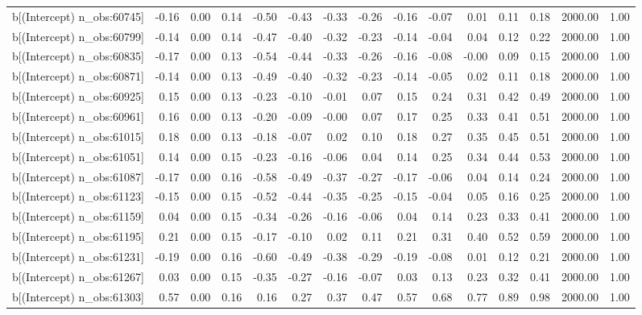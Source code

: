 \begin{table}[ht]
\begin{tabular}{rrrrrrrrrrrrrrr}
  b[(Intercept) n\_obs:60745] & -0.16 & 0.00 & 0.14 & -0.50 & -0.43 & -0.33 & -0.26 & -0.16 & -0.07 & 0.01 & 0.11 & 0.18 & 2000.00 & 1.00 \\ 
  b[(Intercept) n\_obs:60799] & -0.14 & 0.00 & 0.14 & -0.47 & -0.40 & -0.32 & -0.23 & -0.14 & -0.04 & 0.04 & 0.12 & 0.22 & 2000.00 & 1.00 \\ 
  b[(Intercept) n\_obs:60835] & -0.17 & 0.00 & 0.13 & -0.54 & -0.44 & -0.33 & -0.26 & -0.16 & -0.08 & -0.00 & 0.09 & 0.15 & 2000.00 & 1.00 \\ 
  b[(Intercept) n\_obs:60871] & -0.14 & 0.00 & 0.13 & -0.49 & -0.40 & -0.32 & -0.23 & -0.14 & -0.05 & 0.02 & 0.11 & 0.18 & 2000.00 & 1.00 \\ 
  b[(Intercept) n\_obs:60925] & 0.15 & 0.00 & 0.13 & -0.23 & -0.10 & -0.01 & 0.07 & 0.15 & 0.24 & 0.31 & 0.42 & 0.49 & 2000.00 & 1.00 \\ 
  b[(Intercept) n\_obs:60961] & 0.16 & 0.00 & 0.13 & -0.20 & -0.09 & -0.00 & 0.07 & 0.17 & 0.25 & 0.33 & 0.41 & 0.51 & 2000.00 & 1.00 \\ 
  b[(Intercept) n\_obs:61015] & 0.18 & 0.00 & 0.13 & -0.18 & -0.07 & 0.02 & 0.10 & 0.18 & 0.27 & 0.35 & 0.45 & 0.51 & 2000.00 & 1.00 \\ 
  b[(Intercept) n\_obs:61051] & 0.14 & 0.00 & 0.15 & -0.23 & -0.16 & -0.06 & 0.04 & 0.14 & 0.25 & 0.34 & 0.44 & 0.53 & 2000.00 & 1.00 \\ 
  b[(Intercept) n\_obs:61087] & -0.17 & 0.00 & 0.16 & -0.58 & -0.49 & -0.37 & -0.27 & -0.17 & -0.06 & 0.04 & 0.14 & 0.24 & 2000.00 & 1.00 \\ 
  b[(Intercept) n\_obs:61123] & -0.15 & 0.00 & 0.15 & -0.52 & -0.44 & -0.35 & -0.25 & -0.15 & -0.04 & 0.05 & 0.16 & 0.25 & 2000.00 & 1.00 \\ 
  b[(Intercept) n\_obs:61159] & 0.04 & 0.00 & 0.15 & -0.34 & -0.26 & -0.16 & -0.06 & 0.04 & 0.14 & 0.23 & 0.33 & 0.41 & 2000.00 & 1.00 \\ 
  b[(Intercept) n\_obs:61195] & 0.21 & 0.00 & 0.15 & -0.17 & -0.10 & 0.02 & 0.11 & 0.21 & 0.31 & 0.40 & 0.52 & 0.59 & 2000.00 & 1.00 \\ 
  b[(Intercept) n\_obs:61231] & -0.19 & 0.00 & 0.16 & -0.60 & -0.49 & -0.38 & -0.29 & -0.19 & -0.08 & 0.01 & 0.12 & 0.21 & 2000.00 & 1.00 \\ 
  b[(Intercept) n\_obs:61267] & 0.03 & 0.00 & 0.15 & -0.35 & -0.27 & -0.16 & -0.07 & 0.03 & 0.13 & 0.23 & 0.32 & 0.41 & 2000.00 & 1.00 \\ 
  b[(Intercept) n\_obs:61303] & 0.57 & 0.00 & 0.16 & 0.16 & 0.27 & 0.37 & 0.47 & 0.57 & 0.68 & 0.77 & 0.89 & 0.98 & 2000.00 & 1.00 \\ 

\end{tabular}
\end{table}
